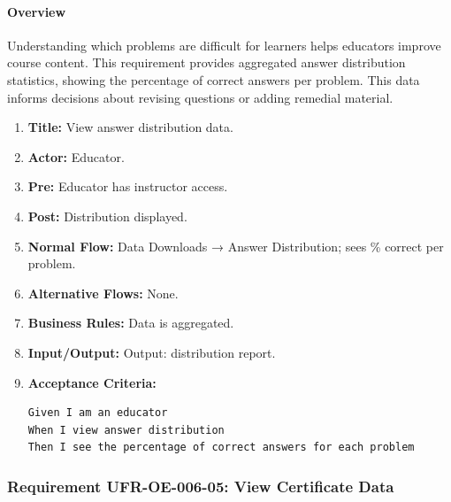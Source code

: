 \paragraph{Overview}
Understanding which problems are difficult for learners helps educators improve course content. This requirement provides aggregated answer distribution statistics, showing the percentage of correct answers per problem. This data informs decisions about revising questions or adding remedial material.
\begin{enumerate}[label=\textbf{\arabic*.}]
\item \textbf{Title:} View answer distribution data.
\item \textbf{Actor:} Educator.
\item \textbf{Pre:} Educator has instructor access.
\item \textbf{Post:} Distribution displayed.
\item \textbf{Normal Flow:} Data Downloads → Answer Distribution; sees \% correct per problem.
\item \textbf{Alternative Flows:} None.
\item \textbf{Business Rules:} Data is aggregated.
\item \textbf{Input/Output:} Output: distribution report.
\item \textbf{Acceptance Criteria:}
    \begin{verbatim}
Given I am an educator
When I view answer distribution
Then I see the percentage of correct answers for each problem
    \end{verbatim}
\end{enumerate}

\subsubsection{Requirement UFR-OE-006-05: View Certificate Data}

